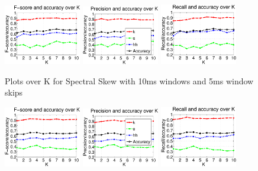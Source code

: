 {{{		\begin{figure}
			\centering\includegraphics[width=0.3\textwidth]{tex/appendices/test/sskew105FP.png}
			\centering\includegraphics[width=0.3\textwidth]{tex/appendices/test/sskew105_P.png}
			\centering\includegraphics[width=0.3\textwidth]{tex/appendices/test/sskew105_R.png}
				
				\caption{Plots over K for Spectral Skew with 10ms windows and 5ms window skips}
		\end{figure}
		\begin{figure}
			\centering\includegraphics[width=0.3\textwidth]{tex/appendices/test/sskew52FP.png}
			\centering\includegraphics[width=0.3\textwidth]{tex/appendices/test/sskew52_P.png}
			\centering\includegraphics[width=0.3\textwidth]{tex/appendices/test/sskew52_R.png}
				

\end{figure}}}}
